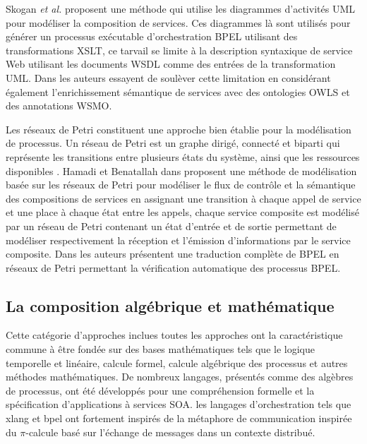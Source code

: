   Skogan \textit{et al.}  \cite{skogan2004web} proposent une méthode
  qui utilise les diagrammes d'activités \textsc{UML} pour modéliser
  la composition de services. Ces diagrammes là sont utilisés pour
  générer un processus exécutable d'orchestration \textsc{BPEL}
  utilisant des transformations \textsc{XSLT}, ce tarvail se limite à
  la description syntaxique de service Web utilisant les documents
  \textsc{WSDL} comme des entrées de la transformation
  \textsc{UML}. Dans \cite{gronmo2005model} les auteurs essayent de
  soulèver cette limitation en considérant également l'enrichissement
  sémantique de services avec des ontologies \textsc{OWLS} et des
  annotations \textsc{WSMO}.\medskip

  Les réseaux de Petri \cite{petri1962kommunikation} constituent une
  approche bien établie pour la modélisation de processus. Un réseau
  de Petri est un graphe dirigé, connecté et biparti qui représente
  les transitions entre plusieurs états du système, ainsi que les
  ressources disponibles \cite{dumez2010approche}. Hamadi et
  Benatallah dans \cite{hamadi2003petri} proposent une méthode de
  modélisation basée sur les réseaux de Petri pour modéliser le flux
  de contrôle et la sémantique des compositions de services en
  assignant une transition à chaque appel de service et une place à
  chaque état entre les appels, chaque service composite est modélisé
  par un réseau de Petri contenant un état d'entrée et de sortie
  permettant de modéliser respectivement la réception et l'émission
  d'informations par le service composite. Dans
  \cite{ouyang2007formal} les auteurs présentent une traduction
  complète de \textsc{BPEL} en réseaux de Petri permettant la
  vérification automatique des processus \textsc{BPEL}.

  \subsection{La composition algébrique et mathématique}
  \label{sec:les-apprc-math}
  Cette catégorie d'approches inclues toutes les approches ont la
  caractéristique commune à être fondée sur des bases mathématiques
  tels que le logique temporelle et linéaire, calcule formel, calcule
  algébrique des processus et autres méthodes mathématiques. De
  nombreux langages, présentés comme des algèbres de processus, ont
  été développés pour une compréhension formelle et la spécification
  d'applications à services \textsc{SOA}. les langages d'orchestration
  tels que \acrshort{xlang} et \acrshort{bpel} ont fortement inspirés
  de la métaphore de communication inspirée du $\pi$-calcule basé sur
  l'échange de messages dans un contexte distribué.\medskip

